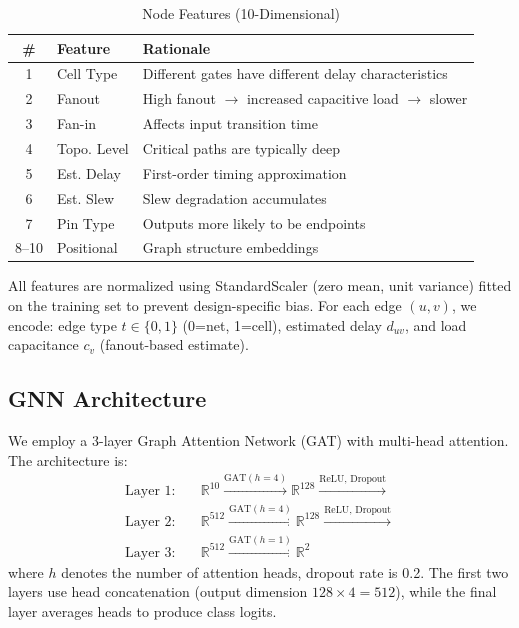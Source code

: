 \begin{table}[t]
\centering
\caption{Node Features (10-Dimensional)}
\label{tab:features}
\begin{tabular}{@{}clp{4.5cm}@{}}
\toprule
\textbf{\#} & \textbf{Feature} & \textbf{Rationale} \\
\midrule
1 & Cell Type & Different gates have different delay characteristics \\
2 & Fanout & High fanout $\rightarrow$ increased capacitive load $\rightarrow$ slower \\
3 & Fan-in & Affects input transition time \\
4 & Topo. Level & Critical paths are typically deep \\
5 & Est. Delay & First-order timing approximation \\
6 & Est. Slew & Slew degradation accumulates \\
7 & Pin Type & Outputs more likely to be endpoints \\
8--10 & Positional & Graph structure embeddings \\
\bottomrule
\end{tabular}
\end{table}

All features are normalized using StandardScaler (zero mean, unit variance) fitted on the training set to prevent design-specific bias. For each edge $(u,v)$, we encode: edge type $t \in \{0, 1\}$ (0=net, 1=cell), estimated delay $d_{uv}$, and load capacitance $c_v$ (fanout-based estimate).

\subsection{GNN Architecture}

We employ a 3-layer Graph Attention Network (GAT) with multi-head attention. The architecture is:
\begin{equation}
\begin{aligned}
\text{Layer 1:} \quad & \mathbb{R}^{10} \xrightarrow{\text{GAT}(h=4)} \mathbb{R}^{128} \xrightarrow{\text{ReLU, Dropout}} \\
\text{Layer 2:} \quad & \mathbb{R}^{512} \xrightarrow{\text{GAT}(h=4)} \mathbb{R}^{128} \xrightarrow{\text{ReLU, Dropout}} \\
\text{Layer 3:} \quad & \mathbb{R}^{512} \xrightarrow{\text{GAT}(h=1)} \mathbb{R}^{2}
\end{aligned}
\label{eq:architecture}
\end{equation}
where $h$ denotes the number of attention heads, dropout rate is 0.2. The first two layers use head concatenation (output dimension $128 \times 4 = 512$), while the final layer averages heads to produce class logits.

